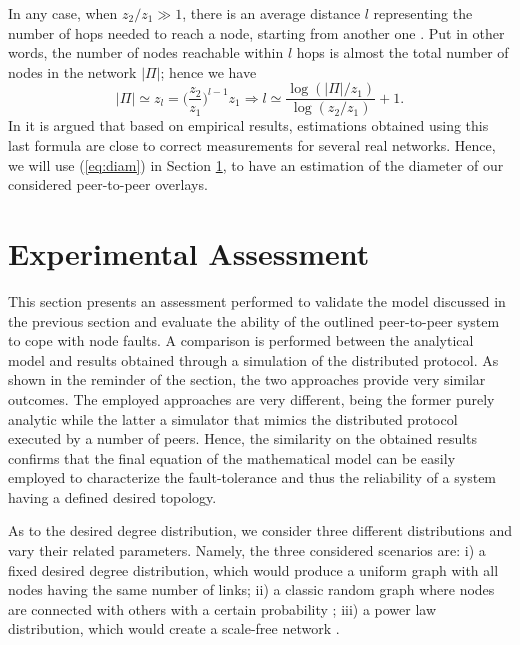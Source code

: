 \documentclass[a4paper,twosided]{article}
\begin{document}
In any case, 
when $z_2 /z_1 \gg 1$, there is an average distance $l$ representing the number of hops needed to reach a node, starting from another one \cite{newmanHandbook}. Put in other words, the number of nodes reachable within $l$ hops is almost the total number of nodes in the network $|\Pi|$; hence we have 
\begin{equation}
|\Pi| \simeq z_l = \Big(\frac{z_2}{z_1}\Big)^{l-1}z_1 \Rightarrow l \simeq \frac{\log(|\Pi|/z_1)}{\log(z_2/z_1)} +1. 
\label{eq:diam}
\end{equation}
In \cite{newmanHandbook} it is argued that based on empirical results, estimations obtained using this last formula are close to correct measurements for several real networks. Hence, we will use (\ref{eq:diam}) in Section \ref{sec:res}, to have an estimation of the diameter of our considered peer-to-peer overlays.



\section{Experimental Assessment}
\label{sec:res}

This section presents an assessment performed to validate the model discussed in the previous section and evaluate the ability of the outlined peer-to-peer system to cope with node faults. A comparison is performed between the analytical model and results obtained through a simulation of the distributed protocol. As shown in the reminder of the section, the two approaches provide very similar outcomes. 
The employed approaches are very different, being the former purely analytic while the latter a simulator that mimics the distributed protocol executed by a number of peers. Hence, the similarity on the obtained results confirms that the final equation of the mathematical model can be easily employed to characterize the fault-tolerance and thus the reliability of  a system having a defined desired topology.

As to the desired degree distribution, we consider three different distributions and vary their related parameters. Namely, the three considered scenarios are: i) a fixed desired degree distribution, which would  produce a uniform graph with all nodes having the same number of links; ii) a classic random graph where nodes are connected with others with a certain probability \cite{newmanHandbook}; iii) a power law distribution, which would create a scale-free network \cite{Barabasi2000,Newman03thestructure,Aiello00arandom,simutools}.
\end{document}
